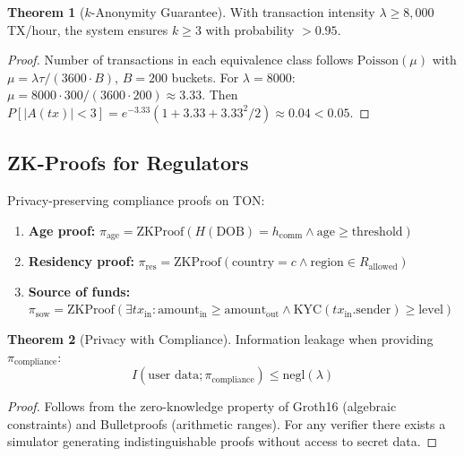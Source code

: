 \documentclass[12pt,a4paper]{article}
\theoremstyle{definition}
\newtheorem{theorem}{Theorem}[section]
\theoremstyle{remark}
\begin{document}
\begin{theorem}[$k$-Anonymity Guarantee]
\label{thm:k-anonymity}
With transaction intensity $\lambda \geq 8{,}000$ TX/hour, the system ensures $k \geq 3$ with probability $> 0.95$.
\end{theorem}

\begin{proof}
Number of transactions in each equivalence class follows $\text{Poisson}(\mu)$ with $\mu = \lambda \tau / (3600 \cdot B)$, $B = 200$ buckets. For $\lambda = 8000$: $\mu = 8000 \cdot 300 / (3600 \cdot 200) \approx 3.33$. Then $P[|A(tx)| < 3] = e^{-3.33}(1 + 3.33 + 3.33^2/2) \approx 0.04 < 0.05$.
\end{proof}

\subsection{ZK-Proofs for Regulators}

Privacy-preserving compliance proofs on TON:
\begin{enumerate}[nosep]
    \item \textbf{Age proof:} $\pi_{\text{age}} = \text{ZKProof}(H(\text{DOB}) = h_{\text{comm}} \wedge \text{age} \geq \text{threshold})$
    \item \textbf{Residency proof:} $\pi_{\text{res}} = \text{ZKProof}(\text{country} = c \wedge \text{region} \in R_{\text{allowed}})$
    \item \textbf{Source of funds:} $\pi_{\text{sow}} = \text{ZKProof}(\exists tx_{\text{in}}: \text{amount}_{\text{in}} \geq \text{amount}_{\text{out}} \wedge \text{KYC}(tx_{\text{in}}.\text{sender}) \geq \text{level})$
\end{enumerate}

\begin{theorem}[Privacy with Compliance]
\label{thm:privacy-compliance}
Information leakage when providing $\pi_{\text{compliance}}$:
\begin{equation}
I(\text{user data}; \pi_{\text{compliance}}) \leq \mathrm{negl}(\lambda)
\end{equation}
\end{theorem}

\begin{proof}
Follows from the zero-knowledge property of Groth16 (algebraic constraints) and Bulletproofs (arithmetic ranges). For any verifier there exists a simulator generating indistinguishable proofs without access to secret data.
\end{proof}
\end{document}

